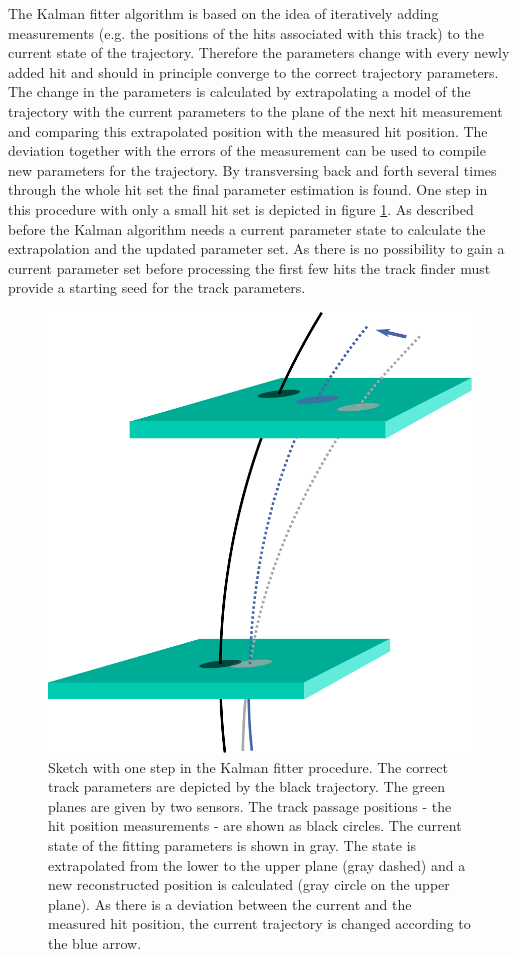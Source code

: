 The Kalman fitter algorithm \cite{kalman} is based on the idea of iteratively adding measurements (e.g. the positions of the hits associated with this track) to the current state of the trajectory. Therefore the parameters change with every newly added hit and should in principle converge to the correct trajectory parameters. The change in the parameters is calculated by extrapolating a model of the trajectory with the current parameters to the plane of the next hit measurement and comparing this extrapolated position with the measured hit position. The deviation together with the errors of the measurement can be used to compile new parameters for the trajectory. By transversing back and forth several times through the whole hit set the final parameter estimation is found. One step in this procedure with only a small hit set is depicted in figure \ref{fig-kalman}. As described before the Kalman algorithm needs a current parameter state to calculate the extrapolation and the updated parameter set. As there is no possibility to gain a current parameter set before processing the first few hits the track finder must provide a starting seed for the track parameters.

\begin{figure}
 \centering
 \includegraphics[width=0.6\linewidth]{figures/theory/kalman.pdf}
 \caption[One step of the Kalman fitter procedure.]{Sketch with one step in the Kalman fitter procedure. The correct track parameters are depicted by the black trajectory. The green planes are given by two sensors. The track passage positions - the hit position measurements - are shown as black circles. The current state of the fitting parameters is shown in gray. The state is extrapolated from the lower to the upper plane (gray dashed) and a new reconstructed position is calculated (gray circle on the upper plane). As there is a deviation between the current and the measured hit position, the current trajectory is changed according to the blue arrow.}
 \label{fig-kalman}
\end{figure}

